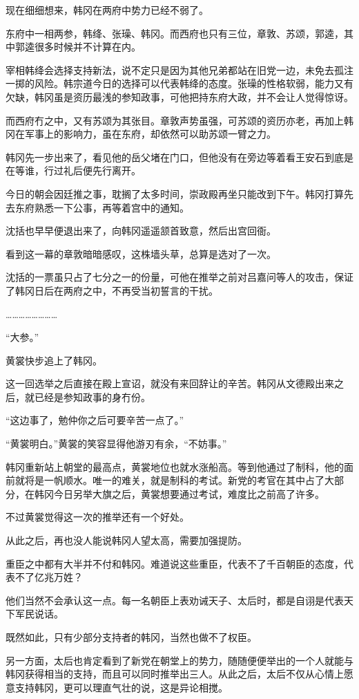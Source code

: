 现在细细想来，韩冈在两府中势力已经不弱了。

东府中一相两参，韩绛、张璪、韩冈。而西府也只有三位，章敦、苏颂，郭逵，其中郭逵很多时候并不计算在内。

宰相韩绛会选择支持新法，说不定只是因为其他兄弟都站在旧党一边，未免去孤注一掷的风险。韩宗道今日的选择可以代表韩绛的态度。张璪的性格软弱，能力又有欠缺，韩冈虽是资历最浅的参知政事，可他把持东府大政，并不会让人觉得惊讶。

而西府冇之中，又有苏颂为其张目。章敦声势虽强，可苏颂的资历亦老，再加上韩冈在军事上的影响力，虽在东府，却依然可以助苏颂一臂之力。

韩冈先一步出来了，看见他的岳父堵在门口，但他没有在旁边等着看王安石到底是在等谁，行过礼后便先行离开。

今日的朝会因廷推之事，耽搁了太多时间，崇政殿再坐只能改到下午。韩冈打算先去东府熟悉一下公事，再等着宫中的通知。

沈括也早早便退出来了，向韩冈遥遥颔首致意，然后出宫回衙。

看到这一幕的章敦暗暗感叹，这株墙头草，总算是选对了一次。

沈括的一票虽只占了七分之一的份量，可他在推举之前对吕嘉问等人的攻击，保证了韩冈日后在两府之中，不再受当初誓言的干扰。

……………………

“大参。”

黄裳快步追上了韩冈。

这一回选举之后直接在殿上宣诏，就没有来回辞让的辛苦。韩冈从文德殿出来之后，就已经是参知政事的身冇份。

“这边事了，勉仲你之后可要辛苦一点了。”

“黄裳明白。”黄裳的笑容显得他游刃有余，“不妨事。”

韩冈重新站上朝堂的最高点，黄裳地位也就水涨船高。等到他通过了制科，他的面前就将是一帆顺水。唯一的难关，就是制科的考试。新党的考官在其中占了大部分，在韩冈今日另举大旗之后，黄裳想要通过考试，难度比之前高了许多。

不过黄裳觉得这一次的推举还有一个好处。

从此之后，再也没人能说韩冈人望太高，需要加强提防。

重臣之中都有大半并不付和韩冈。难道说这些重臣，代表不了千百朝臣的态度，代表不了亿兆万姓？

他们当然不会承认这一点。每一名朝臣上表劝诫天子、太后时，都是自诩是代表天下军民说话。

既然如此，只有少部分支持者的韩冈，当然也做不了权臣。

另一方面，太后也肯定看到了新党在朝堂上的势力，随随便便举出的一个人就能与韩冈获得相当的支持，而且可以同时推举出三人。从此之后，太后不仅从心情上愿意支持韩冈，更可以理直气壮的说，这是异论相搅。

